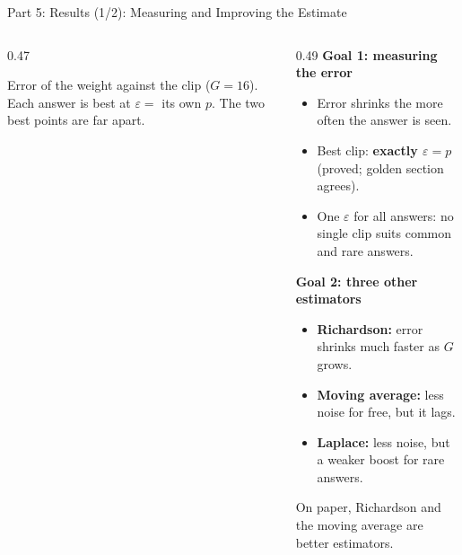 \documentclass[aspectratio=169,10pt]{beamer}
\newcommand{\hit}[1]{\textcolor{mOrange}{\textbf{#1}}}
\begin{document}
\begin{frame}{Part 5: Results (1/2): Measuring and Improving the Estimate}
\begin{columns}[T,onlytextwidth]
\begin{column}{0.47\textwidth}

{\scriptsize\raggedright
Error of the weight against the clip ($G=16$). Each answer is best at
$\varepsilon=$ its own $p$. The two best points are far apart.\par}
\end{column}

\begin{column}{0.49\textwidth}
\footnotesize
\textbf{Goal 1: measuring the error}
\begin{itemize}\setlength\itemsep{0pt}
  \item Error shrinks the more often the answer is seen.
  \item Best clip: \hit{exactly $\varepsilon=p$} (proved; golden section agrees).
  \item One $\varepsilon$ for all answers: \alert{no single clip suits
        common and rare answers}.
\end{itemize}

\smallskip
\textbf{Goal 2: three other estimators}
\begin{itemize}\setlength\itemsep{0pt}
  \item \textbf{Richardson:} error shrinks much faster as $G$ grows.
  \item \textbf{Moving average:} less noise for free, but it lags.
  \item \textbf{Laplace:} less noise, but a weaker boost for rare answers.
\end{itemize}

\smallskip
On paper, Richardson and the moving average are \alert{better estimators}.
\end{column}
\end{columns}
\end{frame}
\end{document}
